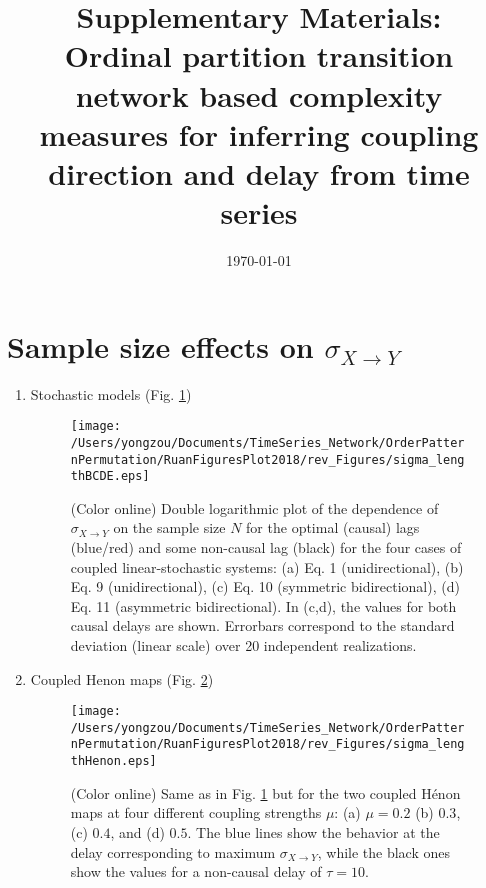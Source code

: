 \documentclass[aps,pre,superscriptaddress,floats,11pt]{revtex4}
\begin{document}
\title{Supplementary Materials: \\ Ordinal partition transition network based complexity measures for inferring coupling direction and delay from time series}

\date{\today}

\maketitle

\renewcommand{\thepage}{SM-\arabic{page}}  
\renewcommand{\thesection}{SM-\Roman{section}}   
\renewcommand{\theequation}{S\arabic{equation}}  
\renewcommand{\thetable}{S\arabic{table}}   
\renewcommand{\thefigure}{S\arabic{figure}}


\section{Sample size effects on $\sigma_{X\to Y}$}
\begin{enumerate}
\item Stochastic models (Fig. \ref{fig:sampleSizeBCDEsigma})
\begin{figure}[htb]
	\centering
	\texttt{[image: /Users/yongzou/Documents/TimeSeries\_Network/OrderPatternPermutation/RuanFiguresPlot2018/rev\_Figures/sigma\_lengthBCDE.eps]}
\caption{(Color online) Double logarithmic plot of the dependence of $\sigma_{X\to Y}$ on the sample size $N$ for the optimal (causal) lags (blue/red) and some non-causal lag (black) for the four cases of coupled linear-stochastic systems: (a) Eq. 1 (unidirectional), (b) Eq. 9 (unidirectional), (c) Eq. 10 (symmetric bidirectional), (d) Eq. 11 (asymmetric bidirectional). In (c,d), the values for both causal delays are shown. Errorbars correspond to the standard deviation (linear scale) over 20 independent realizations.  \label{fig:sampleSizeBCDEsigma}}
\end{figure}

\item Coupled Henon maps (Fig. \ref{fig:sampleSizeHenonsigma})
\begin{figure}[htb]
	\centering
	\texttt{[image: /Users/yongzou/Documents/TimeSeries\_Network/OrderPatternPermutation/RuanFiguresPlot2018/rev\_Figures/sigma\_lengthHenon.eps]}
\caption{(Color online) Same as in Fig. \ref{fig:sampleSizeBCDEsigma} but for the two coupled H\'enon maps at four different coupling strengths $\mu$: (a) $\mu=0.2$ (b) $0.3$, (c) $0.4$, and (d) $0.5$. The blue lines show the behavior at the delay corresponding to maximum $\sigma_{X\to Y}$, while the black ones show the values for a non-causal delay of $\tau=10$. \label{fig:sampleSizeHenonsigma}}
\end{figure}


\end{enumerate}
\end{document}
